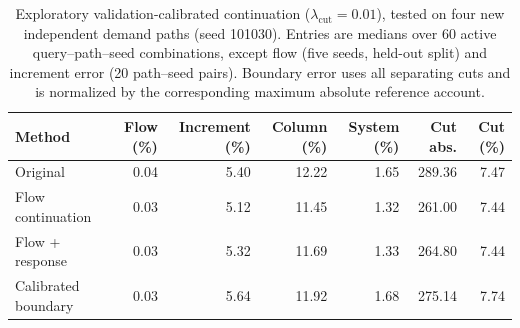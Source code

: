 \begin{table}[t]
\centering\small
\caption{Exploratory validation-calibrated continuation ($\lambda_{\mathrm{cut}}=0.01$), tested on four new independent demand paths (seed 101030). Entries are medians over 60 active query--path--seed combinations, except flow (five seeds, held-out split) and increment error (20 path--seed pairs). Boundary error uses all separating cuts and is normalized by the corresponding maximum absolute reference account.}
\label{tab:calibration-learning}
\begin{tabular}{lrrrrrr}\toprule
Method & Flow (\%) & Increment (\%) & Column (\%) & System (\%) & Cut abs. & Cut (\%)\\\midrule
Original & 0.04 & 5.40 & 12.22 & 1.65 & 289.36 & 7.47\\
Flow continuation & 0.03 & 5.12 & 11.45 & 1.32 & 261.00 & 7.44\\
Flow + response & 0.03 & 5.32 & 11.69 & 1.33 & 264.80 & 7.44\\
Calibrated boundary & 0.03 & 5.64 & 11.92 & 1.68 & 275.14 & 7.74\\
\bottomrule\end{tabular}
\end{table}
